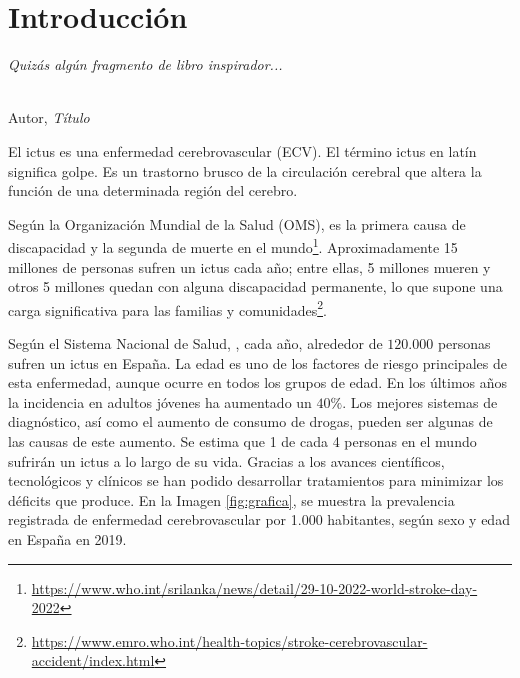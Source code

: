 \chapter{Introducción}
\label{cap:capitulo1}
\setcounter{page}{1}

\begin{flushright}
\begin{minipage}[]{10cm}
\emph{Quizás algún fragmento de libro inspirador...}\\
\end{minipage}\\

Autor, \textit{Título}\\
\end{flushright}

\vspace{1cm}

El ictus es una enfermedad cerebrovascular (ECV).
El término ictus en latín significa golpe.
Es un trastorno brusco de la circulación cerebral que altera la función de una determinada región del cerebro.

Según la Organización Mundial de la Salud (OMS), es la primera causa de discapacidad y la segunda de muerte en el mundo\footnote{\url{https://www.who.int/srilanka/news/detail/29-10-2022-world-stroke-day-2022}}.
Aproximadamente 15 millones de personas sufren un ictus cada año; entre ellas, 5 millones mueren y otros 5 millones quedan con alguna discapacidad permanente, lo que supone una carga significativa para las familias y comunidades\footnote{\url{https://www.emro.who.int/health-topics/stroke-cerebrovascular-accident/index.html}}.

Según el Sistema Nacional de Salud, \cite{perales1a}, cada año, alrededor de $120.000$ personas sufren un ictus en España.
La edad es uno de los factores de riesgo principales de esta enfermedad, aunque ocurre en todos los grupos de edad.
En los últimos años la incidencia en adultos jóvenes ha aumentado un $40\%$.
Los mejores sistemas de diagnóstico, así como el aumento de consumo de drogas, pueden ser algunas de las causas de este aumento.
Se estima que 1 de cada 4 personas en el mundo sufrirán un ictus a lo largo de su vida.
Gracias a los avances científicos, tecnológicos y clínicos se han podido desarrollar tratamientos para minimizar los déficits que produce.
En la Imagen \ref{fig:grafica}, se muestra la prevalencia registrada de enfermedad cerebrovascular por 1.000 habitantes, según sexo y edad en España en 2019.

